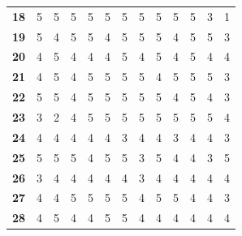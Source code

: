\documentclass{article}
\begin{document}
\begin{table}[!htb]
\begin{minipage}{1\linewidth}
\begin{tabular}{|*{13}{p{0.5cm}|}}
			\textbf{18} & 5            & 5            & 5            & 5            & 5            & 5            & 5            & 5            & 5            & 5            & 3            & 1            \\
			\textbf{19} & 5            & 4            & 5            & 5            & 4            & 5            & 5            & 5            & 4            & 5            & 5            & 3            \\
			\textbf{20} & 4            & 5            & 4            & 4            & 4            & 5            & 4            & 5            & 4            & 5            & 4            & 4            \\
			\textbf{21} & 4            & 5            & 4            & 5            & 5            & 5            & 5            & 4            & 5            & 5            & 5            & 3            \\
			\textbf{22} & 5            & 5            & 4            & 5            & 5            & 5            & 5            & 5            & 4            & 5            & 4            & 3            \\
			\textbf{23} & 3            & 2            & 4            & 5            & 5            & 5            & 5            & 5            & 5            & 5            & 5            & 4            \\
			\textbf{24} & 4            & 4            & 4            & 4            & 4            & 3            & 4            & 4            & 3            & 4            & 4            & 3            \\
			\textbf{25} & 5            & 5            & 5            & 4            & 5            & 5            & 3            & 5            & 4            & 4            & 3            & 5            \\
			\textbf{26} & 3            & 4            & 4            & 4            & 4            & 4            & 3            & 4            & 4            & 4            & 4            & 4            \\
			\textbf{27} & 4            & 4            & 5            & 5            & 5            & 5            & 4            & 5            & 5            & 4            & 4            & 3            \\
			\textbf{28} & 4            & 5            & 4            & 4            & 5            & 5            & 4            & 4            & 4            & 4            & 4            & 4            \\

\end{tabular}
\end{minipage}
\end{table}
\end{document}
